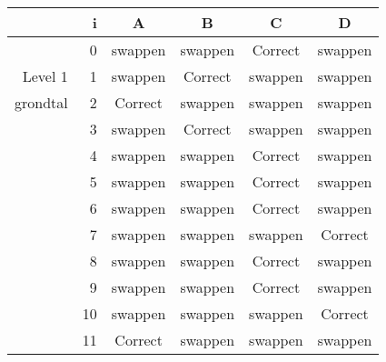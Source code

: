 \begin{tabular}{ rr| c|c|c|c}\hline\hline
     & i & \textbf{A} & \textbf{B} & \textbf{C} & \textbf{D}\\\hline

&0&swappen&swappen&Correct\cellcolor[gray]{0.6}&swappen\\
Level 1 & 1&swappen&Correct\cellcolor[gray]{0.6}&swappen&swappen\\
grondtal &2&Correct\cellcolor[gray]{0.6}&swappen&swappen&swappen\\
&3&swappen&Correct\cellcolor[gray]{0.6}&swappen&swappen\\
&4&swappen&swappen&Correct\cellcolor[gray]{0.6}&swappen\\
&5&swappen&swappen&Correct\cellcolor[gray]{0.6}&swappen\\
&6&swappen&swappen&Correct\cellcolor[gray]{0.6}&swappen\\
&7&swappen&swappen&swappen&Correct\cellcolor[gray]{0.6}\\
&8&swappen&swappen&Correct\cellcolor[gray]{0.6}&swappen\\
&9&swappen&swappen&Correct\cellcolor[gray]{0.6}&swappen\\
&10&swappen&swappen&swappen&Correct\cellcolor[gray]{0.6}\\
&11&Correct\cellcolor[gray]{0.6}&swappen&swappen&swappen\\
\hline\end{tabular}\par\ \newline

